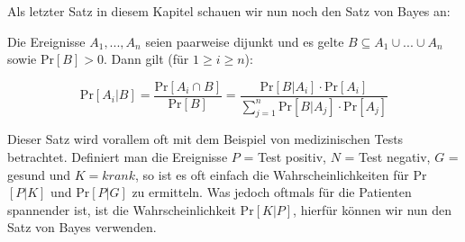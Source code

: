 Als letzter Satz in diesem Kapitel schauen wir nun noch den Satz von Bayes an:

\begin{satz}
    Die Ereignisse $A_1, ... , A_n$ seien paarweise dijunkt und es gelte $B \subseteq A_1 \cup ... \cup A_n$
    sowie Pr$[B] > 0$. Dann gilt (für $1 \geq i \geq n$):

    $$\text{Pr}[A_i | B] = \frac{\text{Pr}[A_i \cap B]}{\text{Pr}[B]} = \frac{\text{Pr}[B | A_i] \cdot \text{Pr}[A_i]}{\sum_{j = 1}^{n}\text{Pr}[B | A_j] \cdot \text{Pr}[A_j]}$$
\end{satz}
\bigskip

Dieser Satz wird vorallem oft mit dem Beispiel von medizinischen Tests betrachtet. Definiert man die
Ereignisse $P$ = Test positiv, $N$ = Test negativ, $G$ = gesund und $K = krank$, so ist es oft einfach
die Wahrscheinlichkeiten für Pr$[P | K]$ und Pr$[P | G]$ zu ermitteln. Was jedoch oftmals für die 
Patienten spannender ist, ist die Wahrscheinlichkeit Pr$[K | P]$, hierfür können wir nun den Satz von
Bayes verwenden. 